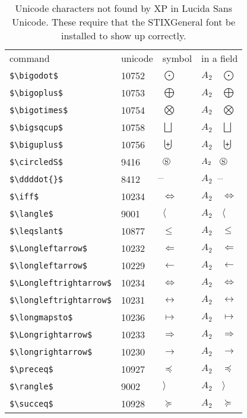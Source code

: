 \documentclass{article}
\begin{document}
\begin{table}
\begin{center}
\begin{tabular}{llll}
 command                     & unicode & symbol               & in a field\\
\verb#$\bigodot$#             & 10752 & $\bigodot$            & $A_2 \quad \bigodot$\\
\verb#$\bigoplus$#            & 10753 & $\bigoplus$           & $A_2 \quad \bigoplus$\\
\verb#$\bigotimes$#           & 10754 & $\bigotimes$          & $A_2 \quad \bigotimes$\\
\verb#$\bigsqcup$#            & 10758 & $\bigsqcup$           & $A_2 \quad \bigsqcup$\\
\verb#$\biguplus$#            & 10756 & $\biguplus$           & $A_2 \quad \biguplus$\\
\verb#$\circledS$#             & 9416 & $\circledS$           & $A_2 \quad \circledS$\\
\verb#$\ddddot{}$#            &  8412 & $\ddddot{}$           & $A_2 \quad \ddddot{}$\\
\verb#$\iff$#                 & 10234 & $\iff$                & $A_2 \quad \iff$\\
\verb#$\langle$#              &  9001 & $\langle$             & $A_2 \quad \langle$\\
\verb#$\leqslant$#            & 10877 & $\leqslant$           & $A_2 \quad \leqslant$\\
\verb#$\Longleftarrow$#       & 10232 & $\Longleftarrow$      & $A_2 \quad \Longleftarrow$\\
\verb#$\longleftarrow$#       & 10229 & $\longleftarrow$      & $A_2 \quad \longleftarrow $\\
\verb#$\Longleftrightarrow$#  & 10234 & $\Longleftrightarrow$ & $A_2 \quad \Longleftrightarrow$\\
\verb#$\longleftrightarrow$#  & 10231 & $\longleftrightarrow$ & $A_2 \quad \longleftrightarrow$\\
\verb#$\longmapsto$#          & 10236 & $\longmapsto$         & $A_2 \quad \longmapsto$\\
\verb#$\Longrightarrow$#      & 10233 & $\Longrightarrow$     & $A_2 \quad \Longrightarrow$\\
\verb#$\longrightarrow$#      & 10230 & $\longrightarrow$     & $A_2 \quad \longrightarrow$\\
\verb#$\preceq$#              & 10927 & $\preceq$             & $A_2 \quad \preceq$\\
\verb#$\rangle$#              &  9002 & $\rangle$             & $A_2 \quad \rangle$\\
\verb#$\succeq$#              & 10928 & $\succeq$             & $A_2 \quad \succeq$\\
\end{tabular}
\end{center}
\caption{Unicode characters not found by XP in Lucida Sans Unicode.
These require that the STIXGeneral font be installed to show up correctly.}
\end{table}
\end{document}
